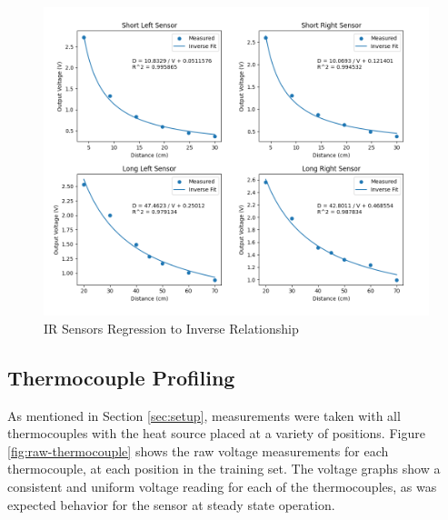 \documentclass[12pt]{article}
\begin{document}
\begin{figure}[H]
    \centering
    \includegraphics[width=\linewidth]{images/IR Sensor Fits.png}
    \caption{IR Sensors Regression to Inverse Relationship}
    \label{fig:regression-ir} %
\end{figure}


\subsection{Thermocouple Profiling} \label{sec:tc-calib}

As mentioned in Section \ref{sec:setup}, measurements were taken with all thermocouples with the heat source placed at a variety of positions. Figure \ref{fig:raw-thermocouple} shows the raw voltage measurements for each thermocouple, at each position in the training set. The voltage graphs show a consistent and uniform voltage reading for each of the thermocouples, as was expected behavior for the sensor at steady state operation.
\end{document}
